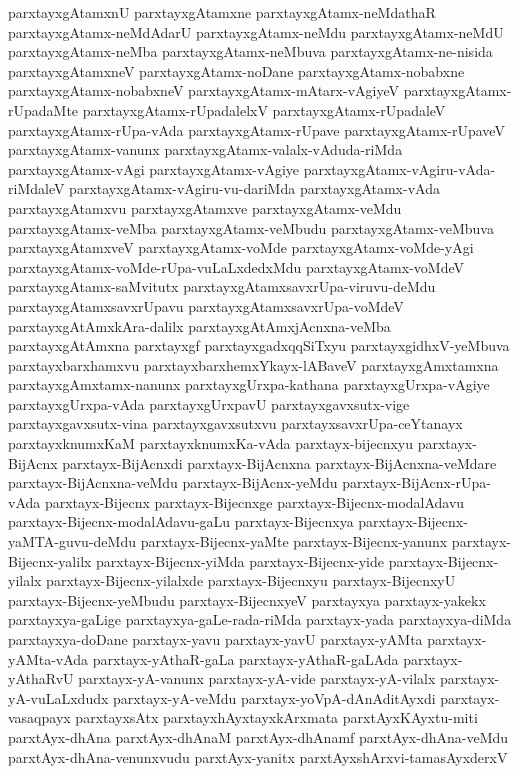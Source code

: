 {parxtayxgAtamxnU
parxtayxgAtamxne
parxtayxgAtamx-neMdathaR
parxtayxgAtamx-neMdAdarU
parxtayxgAtamx-neMdu
parxtayxgAtamx-neMdU
parxtayxgAtamx-neMba
parxtayxgAtamx-neMbuva
parxtayxgAtamx-ne-nisida
parxtayxgAtamxneV
parxtayxgAtamx-noDane
parxtayxgAtamx-nobabxne
parxtayxgAtamx-nobabxneV
parxtayxgAtamx-mAtarx-vAgiyeV
parxtayxgAtamx-rUpadaMte
parxtayxgAtamx-rUpadalelxV
parxtayxgAtamx-rUpadaleV
parxtayxgAtamx-rUpa-vAda
parxtayxgAtamx-rUpave
parxtayxgAtamx-rUpaveV
parxtayxgAtamx-vanunx
parxtayxgAtamx-valalx-vAduda-riMda
parxtayxgAtamx-vAgi
parxtayxgAtamx-vAgiye
parxtayxgAtamx-vAgiru-vAda-riMdaleV
parxtayxgAtamx-vAgiru-vu-dariMda
parxtayxgAtamx-vAda
parxtayxgAtamxvu
parxtayxgAtamxve
parxtayxgAtamx-veMdu
parxtayxgAtamx-veMba
parxtayxgAtamx-veMbudu
parxtayxgAtamx-veMbuva
parxtayxgAtamxveV
parxtayxgAtamx-voMde
parxtayxgAtamx-voMde-yAgi
parxtayxgAtamx-voMde-rUpa-vuLaLxdedxMdu
parxtayxgAtamx-voMdeV
parxtayxgAtamx-saMvitutx
parxtayxgAtamxsavxrUpa-viruvu-deMdu
parxtayxgAtamxsavxrUpavu
parxtayxgAtamxsavxrUpa-voMdeV
parxtayxgAtAmxkAra-dalilx
parxtayxgAtAmxjAcnxna-veMba
parxtayxgAtAmxna
parxtayxgf
parxtayxgadxqqSiTxyu
parxtayxgidhxV-yeMbuva
parxtayxbarxhamxvu
parxtayxbarxhemxYkayx-lABaveV
parxtayxgAmxtamxna
parxtayxgAmxtamx-nanunx
parxtayxgUrxpa-kathana
parxtayxgUrxpa-vAgiye
parxtayxgUrxpa-vAda
parxtayxgUrxpavU
parxtayxgavxsutx-vige
parxtayxgavxsutx-vina
parxtayxgavxsutxvu
parxtayxsavxrUpa-ceYtanayx
parxtayxknumxKaM
parxtayxknumxKa-vAda
parxtayx-bijecnxyu
parxtayx-BijAcnx
parxtayx-BijAcnxdi
parxtayx-BijAcnxna
parxtayx-BijAcnxna-veMdare
parxtayx-BijAcnxna-veMdu
parxtayx-BijAcnx-yeMdu
parxtayx-BijAcnx-rUpa-vAda
parxtayx-Bijecnx
parxtayx-Bijecnxge
parxtayx-Bijecnx-modalAdavu
parxtayx-Bijecnx-modalAdavu-gaLu
parxtayx-Bijecnxya
parxtayx-Bijecnx-yaMTA-guvu-deMdu
parxtayx-Bijecnx-yaMte
parxtayx-Bijecnx-yanunx
parxtayx-Bijecnx-yalilx
parxtayx-Bijecnx-yiMda
parxtayx-Bijecnx-yide
parxtayx-Bijecnx-yilalx
parxtayx-Bijecnx-yilalxde
parxtayx-Bijecnxyu
parxtayx-BijecnxyU
parxtayx-Bijecnx-yeMbudu
parxtayx-BijecnxyeV
parxtayxya
parxtayx-yakekx
parxtayxya-gaLige
parxtayxya-gaLe-rada-riMda
parxtayx-yada
parxtayxya-diMda
parxtayxya-doDane
parxtayx-yavu
parxtayx-yavU
parxtayx-yAMta
parxtayx-yAMta-vAda
parxtayx-yAthaR-gaLa
parxtayx-yAthaR-gaLAda
parxtayx-yAthaRvU
parxtayx-yA-vanunx
parxtayx-yA-vide
parxtayx-yA-vilalx
parxtayx-yA-vuLaLxdudx
parxtayx-yA-veMdu
parxtayx-yoVpA-dAnAditAyxdi
parxtayx-vasaqpayx
parxtayxsAtx
parxtayxhAyxtayxkArxmata
parxtAyxKAyxtu-miti
parxtAyx-dhAna
parxtAyx-dhAnaM
parxtAyx-dhAnamf
parxtAyx-dhAna-veMdu
parxtAyx-dhAna-venunxvudu
parxtAyx-yanitx
parxtAyxshArxvi-tamasAyxderxV
}

